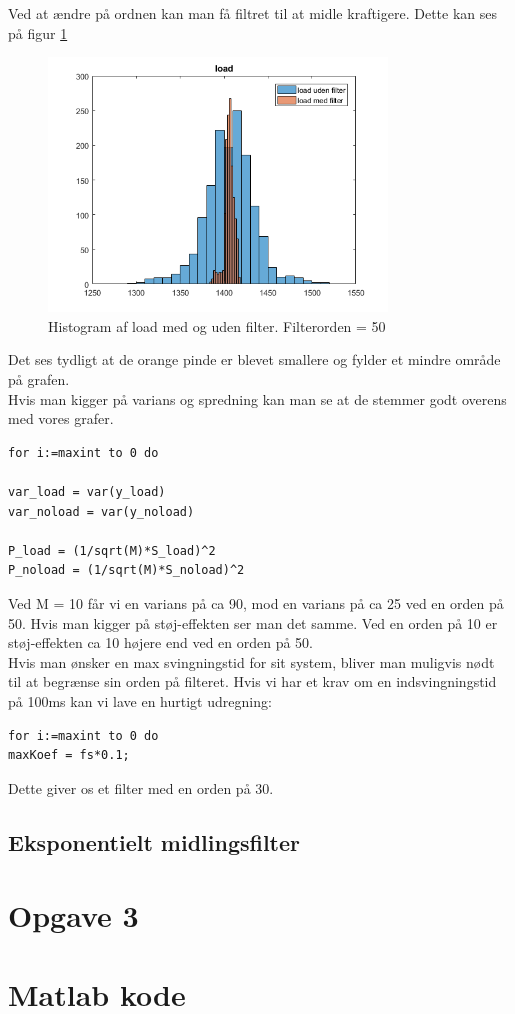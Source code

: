 \documentclass[12pt]{article}
\begin{document}
Ved at ændre på ordnen kan man få filtret til at midle kraftigere. Dette kan ses på figur \ref{fig:histogram3}

\begin{figure}[H]
	\centering
	\includegraphics[width=90mm]{Img/Histogram_load_50.png}
	\caption{Histogram af load med og uden filter. Filterorden = 50}
	\label{fig:histogram3}
\end{figure}

Det ses tydligt at de orange pinde er blevet smallere og fylder et mindre område på grafen.\\
Hvis man kigger på varians og spredning kan man se at de stemmer godt overens med vores grafer. \\
\newpage

\begin{lstlisting}[frame=single]  % Start your code-block
for i:=maxint to 0 do

var_load = var(y_load)
var_noload = var(y_noload)

P_load = (1/sqrt(M)*S_load)^2
P_noload = (1/sqrt(M)*S_noload)^2
\end{lstlisting}

Ved M = 10 får vi en varians på ca 90, mod en varians på ca 25 ved en orden på 50. Hvis man kigger på støj-effekten ser man det samme. Ved en orden på 10 er støj-effekten ca 10 højere end ved en orden på 50.\\

Hvis man ønsker en max svingningstid for sit system, bliver man muligvis nødt til at begrænse sin orden på filteret. Hvis vi har et krav om en indsvingningstid på 100ms kan vi lave en hurtigt udregning:

\begin{lstlisting}[frame=single]  % Start your code-block
for i:=maxint to 0 do
maxKoef = fs*0.1;
\end{lstlisting}

Dette giver os et filter med en orden på 30. 
\subsection{Eksponentielt midlingsfilter}


\section{Opgave 3}

\section{Matlab kode}	
\end{document}
